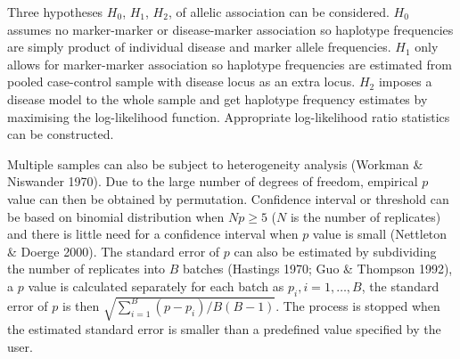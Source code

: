 Three hypotheses $H_0$, $H_1$, $H_2$, of allelic association can be considered.
$H_0$ assumes no marker-marker or disease-marker association so haplotype
frequencies are simply product of individual disease and marker allele
frequencies.  $H_1$ only allows for marker-marker association so haplotype
frequencies are estimated from pooled case-control sample with disease locus as
an extra locus.  $H_2$ imposes a disease model to the whole sample and get
haplotype frequency estimates by maximising the log-likelihood function.
Appropriate log-likelihood ratio statistics can be constructed.

Multiple samples can also be subject to heterogeneity analysis (Workman \&
Niswander 1970).  Due to the large number of degrees of freedom, empirical $p$
value can then be obtained by permutation.  Confidence interval or threshold
can be based on binomial distribution when $Np\ge 5$ ($N$ is the number of
replicates) and there is little need for a confidence interval when $p$ value
is small (Nettleton \& Doerge 2000).  The standard error of $p$ can also be
estimated by subdividing the number of replicates into $B$ batches (Hastings
1970; Guo \& Thompson 1992), a $p$ value is calculated separately for each
batch as $p_i, i=1, \ldots, B$, the standard error of $p$ is then
$\sqrt{{\sum_{i=1}^B(p-p_i)} /{B(B-1)}}$.  The process is stopped when the
estimated standard error is smaller than a predefined value specified by the
user.

